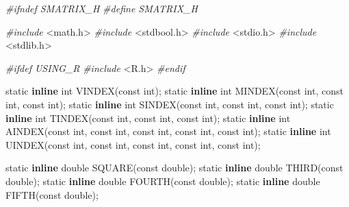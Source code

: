 \documentclass[12pt,]{article}
\newenvironment{Shaded}{\begin{snugshade}}{\end{snugshade}}
\newcommand{\DataTypeTok}[1]{\textcolor[rgb]{0.13,0.29,0.53}{#1}}
\newcommand{\ImportTok}[1]{#1}
\newcommand{\KeywordTok}[1]{\textcolor[rgb]{0.13,0.29,0.53}{\textbf{#1}}}
\newcommand{\NormalTok}[1]{#1}
\newcommand{\PreprocessorTok}[1]{\textcolor[rgb]{0.56,0.35,0.01}{\textit{#1}}}
\begin{document}
\begin{Shaded}
\begin{Highlighting}[]
\PreprocessorTok{#ifndef SMATRIX_H}
\PreprocessorTok{#define SMATRIX_H}

\PreprocessorTok{#include }\ImportTok{<math.h>}
\PreprocessorTok{#include }\ImportTok{<stdbool.h>}
\PreprocessorTok{#include }\ImportTok{<stdio.h>}
\PreprocessorTok{#include }\ImportTok{<stdlib.h>}

\PreprocessorTok{#ifdef USING_R}
\PreprocessorTok{#include }\ImportTok{<R.h>}
\PreprocessorTok{#endif}

\DataTypeTok{static} \KeywordTok{inline} \DataTypeTok{int}\NormalTok{ VINDEX(}\DataTypeTok{const} \DataTypeTok{int}\NormalTok{);}
\DataTypeTok{static} \KeywordTok{inline} \DataTypeTok{int}\NormalTok{ MINDEX(}\DataTypeTok{const} \DataTypeTok{int}\NormalTok{, }\DataTypeTok{const} \DataTypeTok{int}\NormalTok{, }\DataTypeTok{const} \DataTypeTok{int}\NormalTok{);}
\DataTypeTok{static} \KeywordTok{inline} \DataTypeTok{int}\NormalTok{ SINDEX(}\DataTypeTok{const} \DataTypeTok{int}\NormalTok{, }\DataTypeTok{const} \DataTypeTok{int}\NormalTok{, }\DataTypeTok{const} \DataTypeTok{int}\NormalTok{);}
\DataTypeTok{static} \KeywordTok{inline} \DataTypeTok{int}\NormalTok{ TINDEX(}\DataTypeTok{const} \DataTypeTok{int}\NormalTok{, }\DataTypeTok{const} \DataTypeTok{int}\NormalTok{, }\DataTypeTok{const} \DataTypeTok{int}\NormalTok{);}
\DataTypeTok{static} \KeywordTok{inline} \DataTypeTok{int}\NormalTok{ AINDEX(}\DataTypeTok{const} \DataTypeTok{int}\NormalTok{, }\DataTypeTok{const} \DataTypeTok{int}\NormalTok{, }\DataTypeTok{const} \DataTypeTok{int}\NormalTok{, }\DataTypeTok{const} \DataTypeTok{int}\NormalTok{, }\DataTypeTok{const} \DataTypeTok{int}\NormalTok{);}
\DataTypeTok{static} \KeywordTok{inline} \DataTypeTok{int}\NormalTok{ UINDEX(}\DataTypeTok{const} \DataTypeTok{int}\NormalTok{, }\DataTypeTok{const} \DataTypeTok{int}\NormalTok{, }\DataTypeTok{const} \DataTypeTok{int}\NormalTok{, }\DataTypeTok{const} \DataTypeTok{int}\NormalTok{, }\DataTypeTok{const} \DataTypeTok{int}\NormalTok{);}

\DataTypeTok{static} \KeywordTok{inline} \DataTypeTok{double}\NormalTok{ SQUARE(}\DataTypeTok{const} \DataTypeTok{double}\NormalTok{);}
\DataTypeTok{static} \KeywordTok{inline} \DataTypeTok{double}\NormalTok{ THIRD(}\DataTypeTok{const} \DataTypeTok{double}\NormalTok{);}
\DataTypeTok{static} \KeywordTok{inline} \DataTypeTok{double}\NormalTok{ FOURTH(}\DataTypeTok{const} \DataTypeTok{double}\NormalTok{);}
\DataTypeTok{static} \KeywordTok{inline} \DataTypeTok{double}\NormalTok{ FIFTH(}\DataTypeTok{const} \DataTypeTok{double}\NormalTok{);}


\end{Highlighting}
\end{Shaded}
\end{document}
